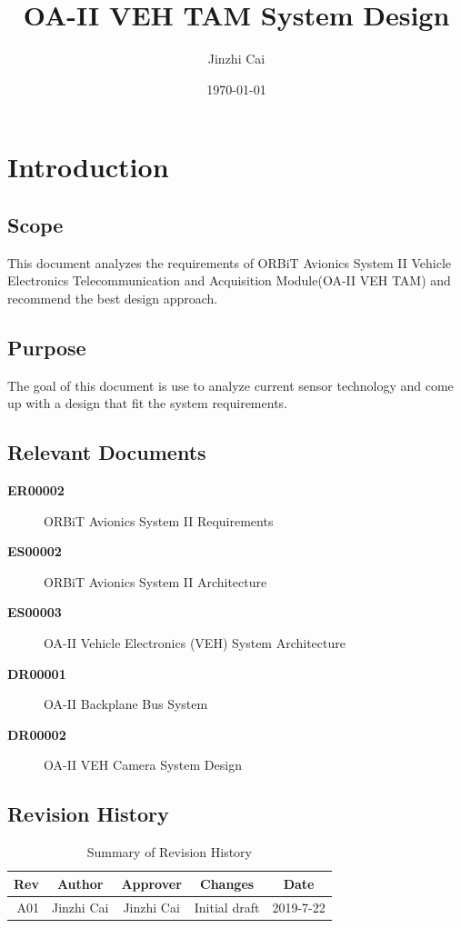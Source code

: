 \documentclass[12pt,article]{memoir}
\title{OA-II VEH TAM System Design}
\author{Jinzhi Cai}
\date{\today}
\begin{document}
	


\tableofcontents*
\clearpage


\chapter{Introduction}
\section{Scope}
This document analyzes the requirements of ORBiT Avionics System II Vehicle Electronics Telecommunication and Acquisition Module(OA-II VEH TAM) and recommend the best design approach.
\section{Purpose}
The goal of this document is use to analyze current sensor technology and come up with a design that fit the system requirements.
\section{Relevant Documents}
\begin{description}
	\item[\textbf{ER00002}]ORBiT Avionics System II Requirements
	\item[\textbf{ES00002}]ORBiT Avionics System II Architecture
	\item[\textbf{ES00003}]OA-II Vehicle Electronics (VEH) System Architecture
	\item[\textbf{DR00001}]OA-II Backplane Bus System
	\item[\textbf{DR00002}]OA-II VEH Camera System Design
\end{description}
\section{Revision History}
\begin{table}[H]
	\centering
	\begin{tabu}{r || c | c | c | c }
		Rev & Author & Approver & Changes & Date\\ \hline
		A01 & Jinzhi Cai & Jinzhi Cai & Initial draft & 2019-7-22 \\
	\end{tabu}
	\caption{Summary of Revision History}
	\label{tab:rev}
\end{table}
\newpage
\end{document}
